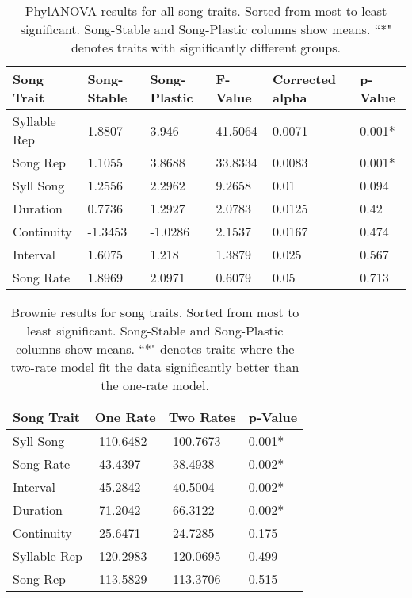 \documentclass[a4paper,12pt]{article}
\begin{document}
\newcommand{\beginsupplement}{%
        \setcounter{table}{0}
        \renewcommand{\thetable}{S\arabic{table}}%
        \setcounter{figure}{0}
        \renewcommand{\thefigure}{S\arabic{figure}}%
     }

    
\begin{table}[ht]
\caption{PhylANOVA results for all song traits.  Sorted from most to least significant.  Song-Stable and Song-Plastic columns show means.  ``*" denotes traits with significantly different groups.}
\centering
\begin{tabular}{llllll}
  \hline
Song Trait & Song-Stable & Song-Plastic & F-Value & Corrected alpha & p-Value \\ 
  \hline
Syllable Rep & 1.8807 & 3.946 & 41.5064 & 0.0071 & 0.001* \\ 
  Song Rep & 1.1055 & 3.8688 & 33.8334 & 0.0083 & 0.001* \\ 
  Syll Song & 1.2556 & 2.2962 & 9.2658 & 0.01 & 0.094 \\ 
  Duration & 0.7736 & 1.2927 & 2.0783 & 0.0125 & 0.42 \\ 
  Continuity & -1.3453 & -1.0286 & 2.1537 & 0.0167 & 0.474 \\ 
  Interval & 1.6075 & 1.218 & 1.3879 & 0.025 & 0.567 \\ 
  Song Rate & 1.8969 & 2.0971 & 0.6079 & 0.05 & 0.713 \\ 
   \hline
\end{tabular}
\end{table}


\begin{table}[ht]
\caption{Brownie results for song traits.  Sorted from most to least significant.  Song-Stable and Song-Plastic columns show means.  ``*" denotes traits where the two-rate model fit the data significantly better than the one-rate model.}
\centering
\begin{tabular}{llll}
  \hline
Song Trait & One Rate & Two Rates & p-Value \\ 
  \hline
Syll Song & -110.6482 & -100.7673 & 0.001* \\ 
  Song Rate & -43.4397 & -38.4938 & 0.002* \\ 
  Interval & -45.2842 & -40.5004 & 0.002* \\ 
  Duration & -71.2042 & -66.3122 & 0.002* \\ 
  Continuity & -25.6471 & -24.7285 & 0.175 \\ 
  Syllable Rep & -120.2983 & -120.0695 & 0.499 \\ 
  Song Rep & -113.5829 & -113.3706 & 0.515 \\ 
   \hline
\end{tabular}
\end{table}
\end{document}
